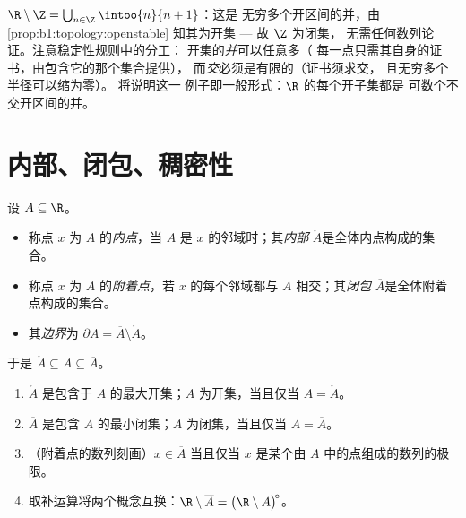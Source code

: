 \begin{example}[由无穷多块拼成的开集]\label{ex:b1:topology:rminusz}
$\R \setminus \Z = \bigcup_{n \in \Z} \intoo{n}{n+1}$：这是
无穷多个开区间的并，由
\cref{prop:b1:topology:openstable} 知其为开集 --- 故 $\Z$ 为闭集，
无需任何数列论证。注意稳定性规则中的分工：
开集的\emph{并}可以任意多（
每一点只需其自身的证书，由包含它的那个集合提供），
而\emph{交}必须是有限的（证书须求交，
且无穷多个半径可以缩为零）。
 将说明这一
例子即一般形式：$\R$ 的每个开子集都是
可数个不交开区间的并。
\end{example}

\section{内部、闭包、稠密性}

\begin{definition}[内部、闭包、边界]\label{def:b1:topology:closure}
设 $A \subseteq \R$。
\begin{itemize}
  \item 称点 $x$ 为 $A$ 的\emph{内点}，当 $A$ 是
        $x$ 的邻域时；其\emph{内部}
        $\mathring{A}$是全体内点构成的集合。
  \item 称点 $x$ 为 $A$ 的\emph{附着点}，若
        $x$ 的每个邻域都与 $A$ 相交；其\emph{闭包}
        $\overline{A}$是全体附着点构成的集合。
  \item 其\emph{边界}为 $\partial A = \overline A \setminus
        \mathring A$。
\end{itemize}
于是 $\mathring A \subseteq A \subseteq \overline A$。
\end{definition}

\begin{proposition}[主要性质]\label{prop:b1:topology:closureprops}
\begin{enumerate}
  \item $\mathring A$ 是包含于 $A$ 的最大开集；$A$
        为开集，当且仅当 $A = \mathring A$。
  \item $\overline A$ 是包含 $A$ 的最小闭集；$A$
        为闭集，当且仅当 $A = \overline A$。
  \item （附着点的数列刻画）$x \in \overline
        A$ 当且仅当 $x$ 是某个由
        $A$ 中的点组成的数列的极限。
  \item 取补运算将两个概念互换：$\R \setminus
        \overline A = \bigl(\R \setminus A\bigr)^{\!\circ}$。
\end{enumerate}
\end{proposition}

